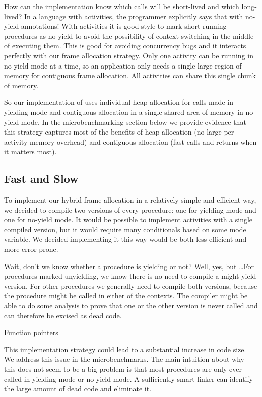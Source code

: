 \documentclass[10pt,preprint]{sigplanconf}
\begin{document}
How can the implementation know which calls will be short-lived and which long-lived?
In a language with activities, the programmer explicitly says that with no-yield annotations!
With activities it is good style to mark short-running procedures as no-yield to avoid the possibility of context switching in the middle of executing them.
This is good for avoiding concurrency bugs and it interacts perfectly with our frame allocation strategy.
Only one activity can be running in no-yield mode at a time, so an application only needs a single large region of memory for contiguous frame allocation.
All activities can share this single chunk of memory.

So our implementation of \charcoal{} uses individual heap allocation for calls made in yielding mode and contiguous allocation in a single shared area of memory in no-yield mode.
In the microbenchmarking section below we provide evidence that this strategy captures most of the benefits of heap allocation (no large per-activity memory overhead) and contiguous allocation (fast calls and returns when it matters most).

\subsection{Fast and Slow}

To implement our hybrid frame allocation in a relatively simple and efficient way, we decided to compile two versions of every procedure: one for yielding mode and one for no-yield mode.
It would be possible to implement activities with a single compiled version, but it would require many conditionals based on some mode variable.
We decided implementing it this way would be both less efficient and more error prone.


Wait, don't we know whether a procedure is yielding or not?  Well, yes,
but \ldots For procedures marked unyielding, we know there is no need to
compile a might-yield version.  For other procedures we generally need
to compile both versions, because the procedure might be called in
either of the contexts.  The compiler might be able to do some analysis
to prove that one or the other version is never called and can therefore
be excised as dead code.

Function pointers

This implementation strategy could lead to a substantial increase in code size.
We address this issue in the microbenchmarks.
The main intuition about why this does not seem to be a big problem is that most procedures are only ever called in yielding mode or no-yield mode.
A sufficiently smart linker can identify the large amount of dead code and eliminate it.
\end{document}
